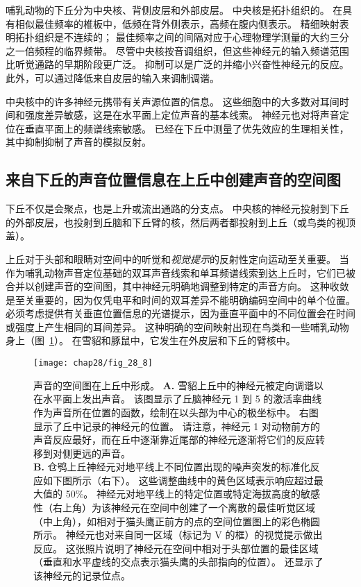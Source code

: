哺乳动物的下丘分为中央核、背侧皮层和外部皮层。
中央核是拓扑组织的。 
在具有相似最佳频率的椎板中，低频在背外侧表示，高频在腹内侧表示。
精细映射表明拓扑组织是不连续的； 
最佳频率之间的间隔对应于心理物理学测量的大约三分之一倍频程的临界频带。
尽管中央核按音调组织，但这些神经元的输入频谱范围比听觉通路的早期阶段更广泛。
抑制可以是广泛的并缩小兴奋性神经元的反应。
此外，可以通过降低来自皮层的输入来调制调谐。


中央核中的许多神经元携带有关声源位置的信息。
这些细胞中的大多数对耳间时间和强度差异敏感，这是在水平面上定位声音的基本线索。
神经元也对将声音定位在垂直平面上的频谱线索敏感。
已经在下丘中测量了优先效应的生理相关性，其中抑制抑制了声音的模拟反射。




\subsection{来自下丘的声音位置信息在上丘中创建声音的空间图}

下丘不仅是会聚点，也是上升或流出通路的分支点。
中央核的神经元投射到下丘的外部皮层，也投射到丘脑和下丘臂的核，然后两者都投射到上丘（或鸟类的视顶盖）。


上丘对于头部和眼睛对空间中的听觉和\textit{视觉提示}的反射性定向运动至关重要。
当作为哺乳动物声音定位基础的双耳声音线索和单耳频谱线索到达上丘时，它们已被合并以创建声音的空间图，其中神经元明确地调整到特定的声音方向。
这种收敛是至关重要的，因为仅凭电平和时间的双耳差异不能明确编码空间中的单个位置。
必须考虑提供有关垂直位置信息的光谱提示，因为垂直平面中的不同位置会在时间或强度上产生相同的耳间差异。
这种明确的空间映射出现在鸟类和一些哺乳动物身上（图~\ref{fig:28_8}）。 
在雪貂和豚鼠中，它发生在外皮层和下丘的臂核中。


\begin{figure}[htbp]
	\centering
	\texttt{[image: chap28/fig\_28\_8]}
	\caption{声音的空间图在上丘中形成。 
		\textbf{A.} 雪貂上丘中的神经元被定向调谐以在水平面上发出声音。
		该图显示了丘脑神经元 1 到 5 的激活率曲线作为声音所在位置的函数，绘制在以头部为中心的极坐标中。
		右图显示了丘中记录的神经元的位置。 
		请注意，神经元 1 对动物前方的声音反应最好，而在丘中逐渐靠近尾部的神经元逐渐将它们的反应转移到对侧更远的声音\cite{king1999sensory}。\\
		\textbf{B.} 仓鸮上丘神经元对地平线上不同位置出现的噪声突发的标准化反应如下图所示（右下）。
		这些调整曲线中的黄色区域表示响应超过最大值的 50\%。
		神经元对地平线上的特定位置或特定海拔高度的敏感性（右上角）为该神经元在空间中创建了一个离散的最佳听觉区域（中上角），如相对于猫头鹰正前方的点的空间位置图上的彩色椭圆所示。
		神经元也对来自同一区域（标记为 V 的框）的视觉提示做出反应。
		这张照片说明了神经元在空间中相对于头部位置的最佳区域（垂直和水平虚线的交点表示猫头鹰的头部指向的位置）。
		还显示了该神经元的记录位点\cite{cohen1999maps}。}
	\label{fig:28_8}
\end{figure}


